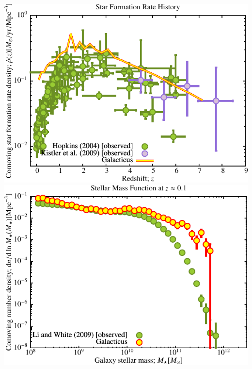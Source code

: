 \includegraphics[scale=0.6]{NGenIC_26214/Plot_Star_Formation_History.pdf} 
\includegraphics[scale=0.6]{NGenIC_26214/Plot_Stellar_Mass_Function.pdf} \\
